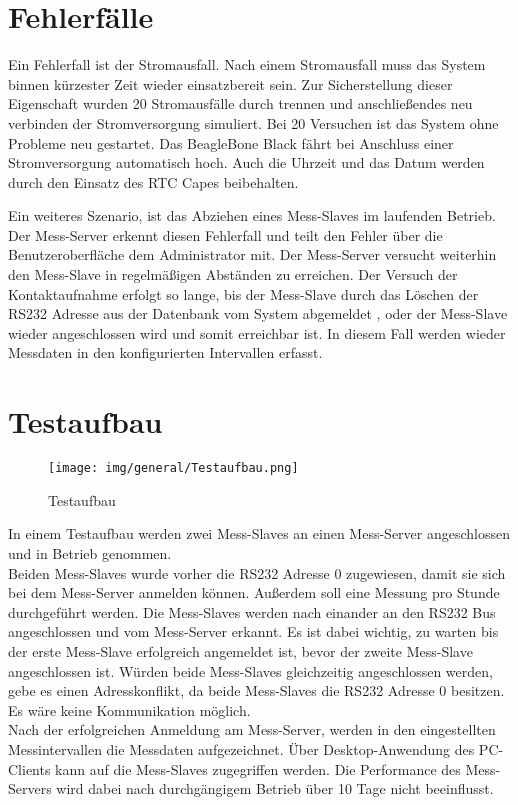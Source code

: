 \section{Fehlerfälle}
Ein Fehlerfall ist der Stromausfall. Nach einem Stromausfall muss das System binnen kürzester Zeit wieder einsatzbereit sein. Zur Sicherstellung dieser Eigenschaft wurden 20 Stromausfälle durch trennen und anschließendes neu verbinden der Stromversorgung simuliert. Bei 20 Versuchen ist das System ohne Probleme neu gestartet. Das BeagleBone Black fährt bei Anschluss einer Stromversorgung automatisch hoch. Auch die Uhrzeit und das Datum werden durch den Einsatz des RTC Capes beibehalten.\ 

Ein weiteres Szenario, ist das Abziehen eines Mess-Slaves im laufenden Betrieb. Der Mess-Server erkennt diesen Fehlerfall und teilt den Fehler über die Benutzeroberfläche dem Administrator mit. Der Mess-Server versucht weiterhin den Mess-Slave in regelmäßigen Abständen zu erreichen. Der Versuch der Kontaktaufnahme erfolgt so lange, bis der Mess-Slave durch das Löschen der RS232 Adresse aus der Datenbank vom System abgemeldet , oder der Mess-Slave wieder angeschlossen wird und somit erreichbar ist. In diesem Fall werden wieder Messdaten in den konfigurierten Intervallen erfasst.

\section{Testaufbau}

\begin{figure}[H]
\begin{center}
\texttt{[image: img/general/Testaufbau.png]}
\caption{Testaufbau}
\label{figure_Testaufbau}
\end{center}
\end{figure}

In einem Testaufbau werden zwei Mess-Slaves an einen Mess-Server angeschlossen und in Betrieb genommen. \\
Beiden Mess-Slaves wurde vorher die RS232 Adresse 0 zugewiesen, damit sie sich bei dem Mess-Server anmelden können. Außerdem soll eine Messung pro Stunde durchgeführt werden. Die Mess-Slaves werden nach einander an den RS232 Bus angeschlossen und vom Mess-Server erkannt. Es ist dabei wichtig, zu warten bis der erste Mess-Slave erfolgreich angemeldet ist, bevor der zweite Mess-Slave angeschlossen ist. Würden beide Mess-Slaves gleichzeitig angeschlossen werden, gebe es einen Adresskonflikt, da beide Mess-Slaves die RS232 Adresse 0 besitzen. Es wäre keine Kommunikation möglich.\\
Nach der erfolgreichen Anmeldung am Mess-Server, werden in den eingestellten Messintervallen die Messdaten aufgezeichnet. Über Desktop-Anwendung des PC-Clients kann auf die Mess-Slaves zugegriffen werden. Die Performance des Mess-Servers wird dabei nach durchgängigem Betrieb über 10 Tage nicht beeinflusst. 


